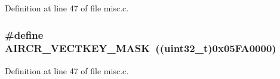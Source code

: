 Definition at line 47 of file misc.\+c.

\subsubsection[{\texorpdfstring{A\+I\+R\+C\+R\+\_\+\+V\+E\+C\+T\+K\+E\+Y\+\_\+\+M\+A\+SK}{AIRCR_VECTKEY_MASK}}]{\setlength{\rightskip}{0pt plus 5cm}\#define A\+I\+R\+C\+R\+\_\+\+V\+E\+C\+T\+K\+E\+Y\+\_\+\+M\+A\+SK~(({\bf uint32\+\_\+t})0x05\+F\+A0000)}\hypertarget{group___m_i_s_c___private___defines_gad6905141fba3a2d8d5570db40805dc6a}{}\label{group___m_i_s_c___private___defines_gad6905141fba3a2d8d5570db40805dc6a}


Definition at line 47 of file misc.\+c.

